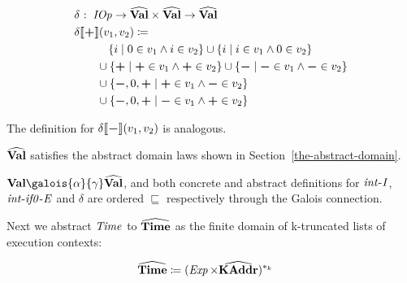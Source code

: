 \small\begin{align*}
&\hspace{0em}  \delta   \mathbin{\colon}   \operatorname{\mathit{IOp}}   \rightarrow   \widehat{\mathtt{\mathbf{Val}}}   \times   \widehat{\mathtt{\mathbf{Val}}}   \rightarrow   \widehat{\mathtt{\mathbf{Val}}}   \\
&\hspace{0em}  \delta  \llbracket  \mathbin{\mathtt{\mathbf{\boldsymbol{+}}}}  \rrbracket (v _1 ,v _2 )  \coloneqq   \\
&\hspace{3em}  \{  i  \;|\;  0  \in  v _1   \wedge  i  \in  v _2   \}   \cup   \{  i  \;|\;  i  \in  v _1   \wedge  0  \in  v _2   \}  \\
&\hspace{2em}  \cup   \{   \mathbin{\mathtt{\mathbf{\boldsymbol{+}}}}   \;|\;   \mathbin{\mathtt{\mathbf{\boldsymbol{+}}}}   \in  v _1   \wedge   \mathbin{\mathtt{\mathbf{\boldsymbol{+}}}}   \in  v _2   \}   \cup   \{   \mathbin{\mathtt{\mathbf{\boldsymbol{-}}}}   \;|\;   \mathbin{\mathtt{\mathbf{\boldsymbol{-}}}}   \in  v _1   \wedge   \mathbin{\mathtt{\mathbf{\boldsymbol{-}}}}   \in  v _2   \}   \\
&\hspace{2em}  \cup   \{   \mathbin{\mathtt{\mathbf{\boldsymbol{-}}}} ,0, \mathbin{\mathtt{\mathbf{\boldsymbol{+}}}}   \;|\;   \mathbin{\mathtt{\mathbf{\boldsymbol{+}}}}   \in  v _1   \wedge   \mathbin{\mathtt{\mathbf{\boldsymbol{-}}}}   \in  v _2   \}   \\
&\hspace{2em}  \cup   \{   \mathbin{\mathtt{\mathbf{\boldsymbol{-}}}} ,0, \mathbin{\mathtt{\mathbf{\boldsymbol{+}}}}   \;|\;   \mathbin{\mathtt{\mathbf{\boldsymbol{-}}}}   \in  v _1   \wedge   \mathbin{\mathtt{\mathbf{\boldsymbol{+}}}}   \in  v _2   \} 
\end{align*}\normalsize

The definition for
$ \delta  \llbracket  \mathbin{\mathtt{\mathbf{\boldsymbol{-}}}}  \rrbracket (v _1 ,v _2 )$ is
analogous. \begin{proposition} $ \widehat{\mathtt{\mathbf{Val}}} $ satisfies the
abstract domain laws shown in Section~\ref{the-abstract-domain}.
\end{proposition} \begin{proposition}
$ \Concrete{\litVal}   \galois{\alpha}{\gamma}   \Abstract{\litVal} $,
and both concrete and abstract definitions for $ \operatorname{\mathit{int-I}} $,
$ \operatorname{\mathit{int-if0-E}} $ and $ \delta $ are ordered $ \sqsubseteq $
respectively through the Galois connection. \end{proposition}

\par

Next we abstract $ \operatorname{\mathit{Time}} $ to $ \widehat{\mathtt{\mathbf{Time}}} $ as the
finite domain of k-truncated lists of execution contexts:

\small\begin{align*}
&\hspace{0em}  \widehat{\mathtt{\mathbf{Time}}}   \coloneqq   (\operatorname{\mathit{Exp}}   \times   \widehat{\mathtt{\mathbf{KAddr}}})  ^{ * _k  } 
\end{align*}\normalsize

